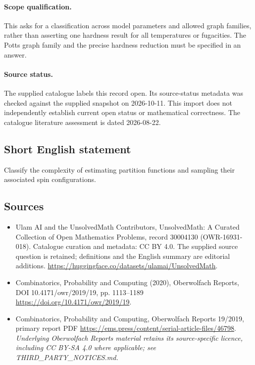 \documentclass[11pt]{article}
\begin{document}
\paragraph{Scope qualification.}
This asks for a classification across model parameters and allowed graph families, rather than asserting one hardness result for all temperatures or fugacities. The Potts graph family and the precise hardness reduction must be specified in an answer.
\paragraph{Source status.}
The supplied catalogue labels this record open. Its source-status metadata was checked against the supplied snapshot on 2026-10-11. This import does not independently establish current open status or mathematical correctness. The catalogue literature assessment is dated 2026-08-22.
\subsection{Short English statement}
Classify the complexity of estimating partition functions and sampling their associated spin configurations.
\subsection{Sources}
\begin{itemize}
\item[S1] Ulam AI and the UnsolvedMath Contributors, UnsolvedMath: A Curated Collection of Open Mathematics Problems, record 30004130 (OWR-16931-018). Catalogue curation and metadata: CC BY 4.0. The supplied source question is retained; definitions and the English summary are editorial additions.
\url{https://huggingface.co/datasets/ulamai/UnsolvedMath}.
\item[S2] Combinatorics, Probability and Computing (2020), Oberwolfach Reports, DOI 10.4171/owr/2019/19, pp. 1113--1189
\url{https://doi.org/10.4171/owr/2019/19}.
\item[S3] Combinatorics, Probability and Computing, Oberwolfach Reports 19/2019, primary report PDF
\url{https://ems.press/content/serial-article-files/46798}.
\textit{Underlying Oberwolfach Reports material retains its source-specific licence, including CC BY-SA 4.0 where applicable; see THIRD\_PARTY\_NOTICES.md.}
\end{itemize}
\end{document}
